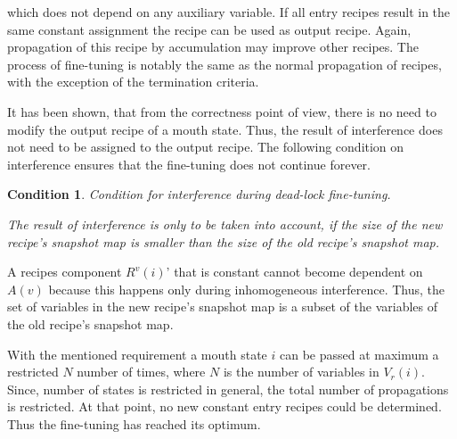 \documentclass[12pt,a4paper]{scrartcl}
\newtheorem{condition}{Condition}
\begin{document}
which does not depend on any auxiliary variable. If all entry recipes result in
the same constant assignment the recipe can be used as output recipe. Again,
propagation of this recipe by accumulation may improve other recipes. The process
of fine-tuning is notably the same as the normal propagation of recipes, with 
the exception of the termination criteria.

It has been shown, that from the correctness point of view, there is no need to
modify the output recipe of a mouth state. Thus, the result of interference
does not need to be assigned to the output recipe. The following condition 
on interference ensures that the fine-tuning does not continue forever.

\begin{condition}
Condition for interference during dead-lock fine-tuning.

The result of interference is only to be taken into account, if the size of the
new recipe's snapshot map is smaller than the size of the old recipe's snapshot
map.  
\end{condition}

A recipes component $R^v(i)$' that is constant cannot become dependent on
$A(v)$ because this happens only during inhomogeneous interference. Thus, the
set of variables in the new recipe's snapshot map is a subset of the variables
of the old recipe's snapshot map.

With the mentioned requirement a mouth state $i$ can be passed at maximum a
restricted $N$ number of times, where $N$ is the number of variables in
$V_r(i)$. Since, number of states is restricted in general, the total number of
propagations is restricted. At that point, no new constant entry recipes could
be determined. Thus the fine-tuning has reached its optimum.
\end{document}
